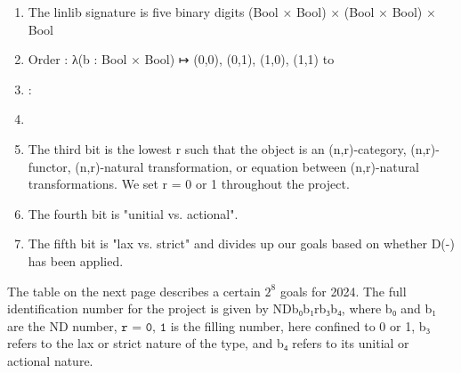 \documentclass{book}
\theoremstyle{definition}
\begin{document}
\begin{enumerate}
\item The linlib signature is five binary digits (Bool × Bool) × (Bool × Bool) × Bool
\item Order : λ(b : Bool × Bool) ↦ (0,0), (0,1), (1,0), (1,1) to 
\item  : 
\item 
\item The third bit is the lowest r such that the object is an (n,r)-category, (n,r)-functor, (n,r)-natural transformation, or equation between (n,r)-natural transformations. We set r = 0 or 1 throughout the project.
\item The fourth bit is "unitial vs. actional".
\item The fifth bit is "lax vs. strict" and divides up our goals based on whether D(-) has been applied.
\end{enumerate}

The table on the next page describes a certain $2^8$ goals for 2024. The full identification number for the project is given by NDb₀b₁rb₃b₄, where b₀ and b₁ are the ND number, $\texttt{r = 0, 1}$ is the filling number, here confined to 0 or 1, b₃ refers to the lax or strict nature of the type, and b₄ refers to its unitial or actional nature.\\

\fi
\end{document}

